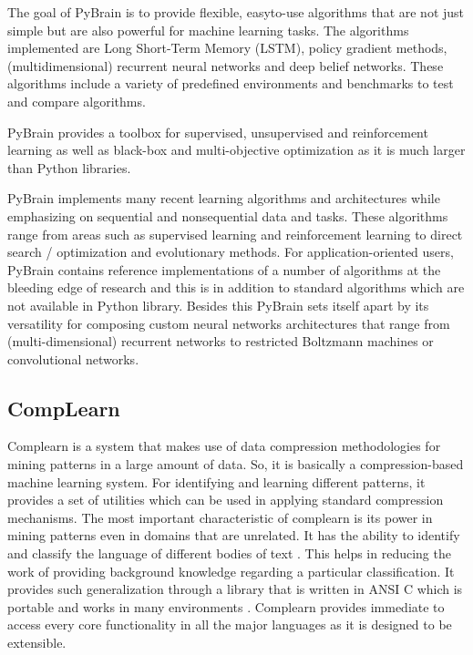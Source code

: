     The goal of PyBrain is to provide flexible, easyto-use algorithms
    that are not just simple but are also powerful for machine
    learning tasks. The algorithms implemented are Long Short-Term
    Memory (LSTM), policy gradient methods, (multidimensional)
    recurrent neural networks and deep belief networks. These
    algorithms include a variety of predefined environments and
    benchmarks to test and compare algorithms.

    PyBrain provides a toolbox for supervised, unsupervised and
    reinforcement learning as well as black-box and multi-objective
    optimization as it is much larger than Python libraries.

    PyBrain implements many recent learning algorithms and
    architectures while emphasizing on sequential and nonsequential
    data and tasks. These algorithms range from areas such as
    supervised learning and reinforcement learning to direct search /
    optimization and evolutionary methods.  For application-oriented
    users, PyBrain contains reference implementations of a number of
    algorithms at the bleeding edge of research and this is in
    addition to standard algorithms which are not available in Python
    library. Besides this PyBrain sets itself apart by its versatility
    for composing custom neural networks architectures that range from
    (multi-dimensional) recurrent networks to restricted Boltzmann
    machines or convolutional networks.
    
\subsection{CompLearn}

    Complearn is a system that makes use of data compression
    methodologies for mining patterns in a large amount of data. So,
    it is basically a compression-based machine learning system. For
    identifying and learning different patterns, it provides a set of
    utilities which can be used in applying standard compression
    mechanisms. The most important characteristic of complearn is its
    power in mining patterns even in domains that are unrelated. It
    has the ability to identify and classify the language of different
    bodies of text \cite{comp1}. This helps in reducing the work of
    providing background knowledge regarding a particular
    classification. It provides such generalization through a library
    that is written in ANSI C which is portable and works in many
    environments \cite{comp1}. Complearn provides immediate to access
    every core functionality in all the major languages as it is
    designed to be extensible.

